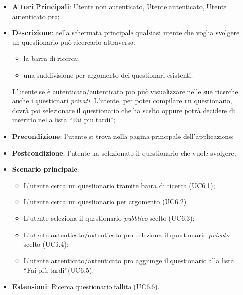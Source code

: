 \begin{itemize}
\item\textbf{Attori Principali}: Utente non autenticato, Utente autenticato, Utente autenticato pro;
\item\textbf{Descrizione}: nella schermata principale qualsiasi utente che voglia svolgere un questionario può ricercarlo attraverso:
\begin{itemize}
\item la barra di ricerca;
\item una suddivisione per argomento dei questionari esistenti.
\end{itemize}
L'utente se è autenticato/autenticato pro può visualizzare nelle sue ricerche anche i questionari \textit{privati}. L'utente, per poter compilare un questionario, dovrà poi selezionare il questionario che ha scelto oppure potrà decidere di inserirlo nella lista ``Fai più tardi'';	
\item\textbf{Precondizione}: l'utente si trova nella pagina principale dell'applicazione;
\item\textbf{Postcondizione}: l'utente ha selezionato il questionario che vuole svolgere;
\item\textbf{Scenario principale}:
\begin{itemize}
\item L'utente cerca un questionario tramite barra di ricerca (UC6.1);
\item L'utente cerca un questionario per argomento (UC6.2);
\item L'utente seleziona il questionario \textit{pubblico} scelto (UC6.3);
\item L'utente autenticato/autenticato pro seleziona il questionario \textit{privato} scelto (UC6.4);
\item L'utente autenticato/autenticato pro aggiunge il questionario alla lista ``Fai più tardi''(UC6.5).
\end{itemize}
\item\textbf{Estensioni}: Ricerca questionario fallita (UC6.6).
\end{itemize}

